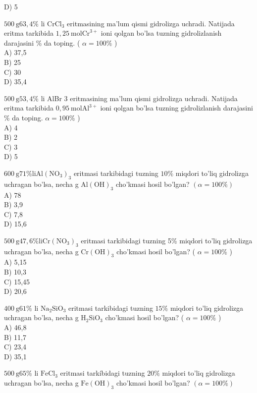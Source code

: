 D) 5
  \item $500 \mathrm{~g} 63,4 \%$ li $\mathrm{CrCl}_{3}$ eritmasining ma'lum qismi gidrolizga uchradi. Natijada eritma tarkibida $1,25 \mathrm{~mol} \mathrm{Cr}^{3+}$ ioni qolgan bo'lsa tuzning gidrolizlanish darajasini \% da toping. ( $\alpha=100 \%$ )\\
A) 37,5\\
B) 25\\
C) 30\\
D) 35,4
  \item $500 \mathrm{~g} 53,4 \%$ li AlBr 3 eritmasining ma'lum qismi gidrolizga uchradi. Natijada eritma tarkibida $0,95 \mathrm{~mol} \mathrm{Al}^{3+}$ ioni qolgan bo'lsa tuzning gidrolizlanish darajasini \% da toping. $\alpha=100 \%$ )\\
A) 4\\
B) 2\\
C) 3\\
D) 5
  \item $600 \mathrm{~g} 71 \% \mathrm{li} \mathrm{Al}\left(\mathrm{NO}_{3}\right)_{3}$ eritmasi tarkibidagi tuzning $10 \%$ miqdori to'liq gidrolizga uchragan bo'lsa, necha g $\mathrm{Al}(\mathrm{OH})_{3}$ cho'kmasi hosil bo'lgan? $(\alpha=100 \%)$\\
A) 78\\
B) 3,9\\
C) 7,8\\
D) 15,6
  \item $500 \mathrm{~g} 47,6 \% \mathrm{li} \mathrm{Cr}\left(\mathrm{NO}_{3}\right)_{3}$ eritmasi tarkibidagi tuzning 5\% miqdori to'liq gidrolizga uchragan bo'lsa, necha g $\mathrm{Cr}(\mathrm{OH})_{3}$ cho'kmasi hosil bo'lgan? ( $\alpha=100 \%$ )\\
A) 5,15\\
B) 10,3\\
C) 15,45\\
D) 20,6
  \item $400 \mathrm{~g} 61 \%$ li $\mathrm{Na}_{2} \mathrm{SiO}_{3}$ eritmasi tarkibidagi tuzning $15 \%$ miqdori to'liq gidrolizga uchragan bo'lsa, necha g $\mathrm{H}_{2} \mathrm{SiO}_{3}$ cho'kmasi hosil bo'lgan? ( $\alpha=100 \%$ )\\
A) 46,8\\
B) 11,7\\
C) 23,4\\
D) 35,1
  \item $500 \mathrm{~g} 65 \%$ li $\mathrm{FeCl}_{3}$ eritmasi tarkíbidagi tuzning $20 \%$ miqdori to'liq gidrolizga uchragan bo'lsa, necha g $\mathrm{Fe}(\mathrm{OH})_{3}$ cho'kmasi hosil bo'lgan? $(\alpha=100 \%)$\\
